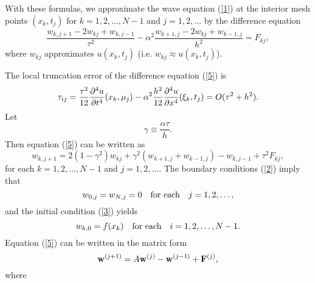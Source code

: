    
With these formulas, we approximate the
wave equation (\ref{1}) at the interior mesh points $(x_{k},
t_{j})$ for $k=1, 2, \dots, N-1$ and $j=1, 2, \dots$ by the
difference equation
\begin{equation}
\frac{w_{k,j+1}-2w_{kj}+w_{k,j-1}}{\tau^{2}}-\alpha^{2}
\frac{w_{k+1, j}-2w_{kj}+w_{k-1,j}}{h^{2}}=F_{kj}, \label{5}
\end{equation}
where $w_{kj}$ approximates $u(x_{k},t_{j})$ (i.e. $w_{kj}\approx
u(x_{k},t_{j})$).

    The local truncation error of the
difference equation (\ref{5}) is
\[
\tau_{ij}=\frac{\tau^{2}}{12}\frac{{\partial}^{4} u}{{\partial} t^{4}}(x_{k},
\mu_{j})-\alpha^2 \frac{h^{2}}{12}\frac{{\partial}^{4} u}{{\partial}
x^{4}}(\xi_{k}, t_{j})=O(\tau^{2}+h^{2}).
\]
Let
\[
\gamma\equiv\frac{\alpha\tau}{h}.
\]
Then equation (\ref{5}) can be written as
\begin{equation}
w_{k,j+1}=2\left(1-\gamma^{2}\right)w_{kj}+
\gamma^{2}\left(w_{k+1, j}+w_{k-1,j}\right)-w_{k,j-1}+\tau^2
F_{kj} , \label{6}
\end{equation}
for each $k=1, 2, \dots, N-1$ and $j=1, 2, \dots$. The boundary
conditions (\ref{2}) imply that
\begin{equation}
w_{0,j}=w_{N,j}=0 \quad \hbox{for each} \quad j=1, 2, \dots,
\label{7}
\end{equation}
and the initial condition (\ref{3}) yields
\begin{equation}
w_{k,0}=f(x_{k}) \quad \hbox{for each} \quad i=1, 2, \dots, N-1.
\label{8}
\end{equation}
Equation (\ref{5}) can be written in the matrix form
\begin{equation}
{\bf w}^{(j+1)}=A{\bf w}^{(j)}-{\bf w}^{(j-1)}+{\bf F}^{(j)},
\label{9}
\end{equation}
where
